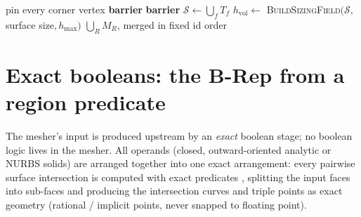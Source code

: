 \documentclass[11pt,a4paper]{article}
\numberwithin{equation}{section}
\begin{document}
\begin{algorithm}[H]
\caption{\textsc{Mesh}$(\mathcal{B},h_{\max},\varepsilon)$: top-level driver}
\label{alg:mesh}
pin every corner vertex\hfill{}\;
\textbf{barrier}\;
\textbf{barrier}\;
$\mathcal{S}\gets\bigcup_f T_f$ \hfill{}\;
$h_{\text{vol}}\gets$ \textsc{BuildSizingField}$(\mathcal{S},\,$surface size$,h_{\max})$\;
\Return $\bigcup_R M_R$, merged in fixed id order\;
\end{algorithm}

\section{Exact booleans: the B-Rep from a region predicate}
\label{sec:booleans}
The mesher's input is produced upstream by an \emph{exact} boolean stage; no
boolean logic lives in the mesher. All operands (closed, outward-oriented
analytic or NURBS solids) are arranged together into one exact arrangement: every
pairwise surface intersection is computed with exact predicates
\cite{Shewchuk1997}, splitting the input faces into sub-faces and producing the
intersection curves and triple points as exact geometry (rational / implicit
points, never snapped to floating point).
\end{document}
